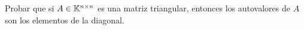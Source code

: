 \item Probar que si $A\in\mathbb{K}^{n\times n}$ es una matriz triangular, entonces los autovalores de $A$ son los elementos de la diagonal.
    \begin{mdframed}[style=s]
        
    \end{mdframed}